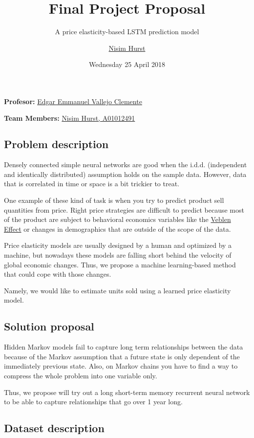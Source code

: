 \documentclass[]{article}
\title{Final Project Proposal}
\subtitle{A price elasticity-based LSTM prediction model}
\author{\href{mailto:langheran@gmail.com}{Nisim Hurst}}
\date{Wednesday 25 April 2018}
\theoremstyle{definition}
\theoremstyle{definition}
\theoremstyle{definition}
\theoremstyle{remark}
\begin{document}
\maketitle

\textbf{Profesor:} \href{mailto:vallejo@itesm.mx}{Edgar Emmanuel Vallejo
Clemente}

\textbf{Team Members:} \href{mailto:A01012491@itesm.mx}{Nisim Hurst,
A01012491}

\subsection{Problem description}\label{problem-description}

Densely connected simple neural networks are good when the i.d.d.
(independent and identically distributed) assumption holds on the sample
data. However, data that is correlated in time or space is a bit
trickier to treat.

One example of these kind of task is when you try to predict product
sell quantities from price. Right price strategies are difficult to
predict because most of the product are subject to behavioral economics
variables like the
\href{https://en.wikipedia.org/wiki/Veblen_good}{Veblen Effect} or
changes in demographics that are outside of the scope of the data.

Price elasticity models are usually designed by a human and optimized by
a machine, but nowadays these models are falling short behind the
velocity of global economic changes. Thus, we propose a machine
learning-based method that could cope with those changes.

Namely, we would like to estimate units sold using a learned price
elasticity model.

\subsection{Solution proposal}\label{solution-proposal}

Hidden Markov models fail to capture long term relationships between the
data because of the Markov assumption that a future state is only
dependent of the immediately previous state. Also, on Markov chains you
have to find a way to compress the whole problem into one variable only.

Thus, we propose will try out a long short-term memory recurrent neural
network to be able to capture relationships that go over 1 year long.

\subsection{Dataset description}\label{dataset-description}
\end{document}

